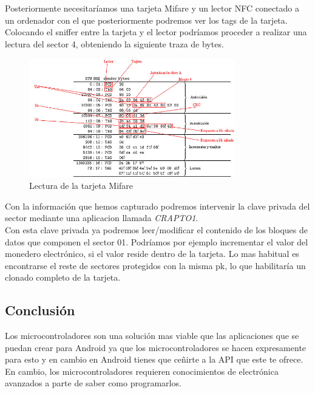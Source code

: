 Posteriormente necesitaríamos una tarjeta Mifare y un lector NFC conectado a un ordenador con el que posteriormente podremos ver los tags de la tarjeta. Colocando el sniffer entre la tarjeta y el lector podríamos proceder a realizar una lectura del sector 4, obteniendo la siguiente traza de bytes.

\begin{figure}[!h]
	\centering
	\includegraphics[width=0.8\textwidth]{figures/lectura.jpg}
	\caption{Lectura de la tarjeta Mifare}
\end{figure}

Con la información que hemos capturado podremos intervenir la clave privada del sector mediante una aplicacion llamada \textit{CRAPTO1}. \\

Con esta clave privada ya podremos leer/modificar el contenido de los bloques de datos que componen el sector 01. Podríamos por ejemplo incrementar el valor del monedero electrónico, si el valor reside dentro de la tarjeta. Lo mas habitual es encontrarse el reste de sectores protegidos con la misma pk, lo que habilitaría un clonado completo de la tarjeta.

\subsection{Conclusión}

Los microcontroladores son una solución mas viable que las aplicaciones que se puedan crear para Android ya que los microcontroladores se hacen expresamente para esto y en cambio en Android tienes que ceñirte a la API que este te ofrece. En cambio, los microcontroladores requieren conocimientos de electrónica avanzados a parte de saber como programarlos.



